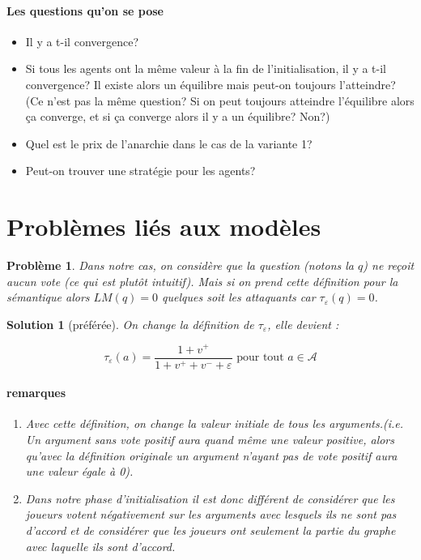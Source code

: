 \documentclass[12pt]{article}
\theoremstyle{defi}
\theoremstyle{not}
\theoremstyle{prob}
\newtheorem{problem}{Problème}
\newtheorem{solution}{Solution}
\begin{document}
    \paragraph{Les questions qu'on se pose}
    \begin{itemize}
      \item Il y a t-il convergence?
      \item Si tous les agents ont la même valeur à la fin de l'initialisation, il y a t-il convergence? Il existe alors un équilibre mais peut-on toujours l'atteindre? (Ce n'est pas la même question? Si on peut toujours atteindre l'équilibre alors ça converge, et si ça converge alors il y a un équilibre? Non?)
      \item Quel est le prix de l'anarchie dans le cas de la variante 1?
      \item Peut-on trouver une stratégie pour les agents?
    \end{itemize}



\section{Problèmes liés aux modèles}
\begin{problem}
  Dans notre cas, on considère que la question (notons la $q$) ne reçoit aucun vote (ce qui est plutôt intuitif). Mais si on prend cette définition pour la sémantique alors $LM(q) = 0$ quelques soit les attaquants car $\tau_\varepsilon(q) = 0$.
\end{problem}

\begin{solution}[préférée]
  On change la définition de $\tau_\varepsilon$, elle devient :

  $$\tau_\varepsilon(a) = \frac{1 + v^+}{1 + v^+ + v^- + \varepsilon} \mbox{ pour tout } a \in \mathcal{A}$$

  \paragraph{remarques}
    \begin{enumerate}
      \item Avec cette définition, on change la valeur initiale de tous les arguments.(i.e. Un argument sans vote positif aura quand même une valeur positive, alors qu'avec la définition originale un argument n'ayant pas de vote positif aura une valeur égale à 0).

      \item Dans notre phase d'initialisation il est donc différent de considérer que les joueurs votent négativement sur les arguments avec lesquels ils ne sont pas d'accord et de considérer que les joueurs ont seulement la partie du graphe avec laquelle ils sont d'accord.
    \end{enumerate}
\end{solution}
\end{document}

